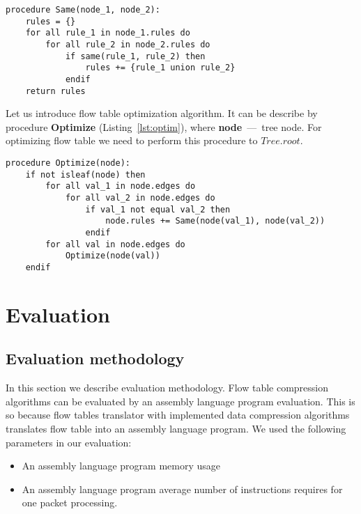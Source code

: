 \documentclass[conference]{IEEEtran}
\begin{document}
\begin{lstlisting}[float=htb,caption=Procedure for obtaining a set of rules derivedfrom the same rules,label=lst:same]
procedure Same(node_1, node_2):
    rules = {}
    for all rule_1 in node_1.rules do
        for all rule_2 in node_2.rules do
            if same(rule_1, rule_2) then
                rules += {rule_1 union rule_2}
            endif
    return rules
\end{lstlisting}

            Let us introduce flow table optimization algorithm. It can be describe by procedure \textbf{Optimize} (Listing~\ref{lst:optim}), 
            where \textbf{node}~---~tree node. For optimizing flow table we need to perform this procedure to \(Tree.root\).

\begin{lstlisting}[float=htb,caption=Procedure for optimizing the tree,label=lst:optim]
procedure Optimize(node):
    if not isleaf(node) then
        for all val_1 in node.edges do
            for all val_2 in node.edges do
                if val_1 not equal val_2 then
                    node.rules += Same(node(val_1), node(val_2))
                endif
        for all val in node.edges do
            Optimize(node(val))
    endif
\end{lstlisting}

    \section{Evaluation}
        \subsection{Evaluation methodology}
        In this section we describe evaluation methodology. Flow table compression algorithms can be evaluated by an 
        assembly language program evaluation. This is so because flow tables translator with implemented data compression algorithms 
        translates flow table into an assembly language program.
        We used the following parameters in our evaluation:
        \begin{itemize}
            \item An assembly language program memory usage%
            \item An assembly language program average number of instructions requires for one packet processing.%
        \end{itemize}
        
\end{document}
